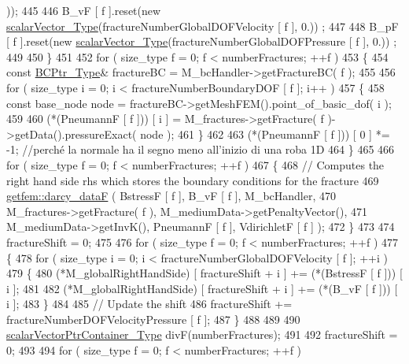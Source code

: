 \begin{DoxyCode}
      ));
445 
446         B\_vF [ f ].reset(\textcolor{keyword}{new} \hyperlink{Core_8h_a4e75b5863535ba1dd79942de2846eff0}{scalarVector\_Type}(fractureNumberGlobalDOFVelocity [ f ], 0.))
      ;
447 
448         B\_pF [ f ].reset(\textcolor{keyword}{new} \hyperlink{Core_8h_a4e75b5863535ba1dd79942de2846eff0}{scalarVector\_Type}(fractureNumberGlobalDOFPressure [ f ], 0.))
      ;
449         
450     \}
451 
452     \textcolor{keywordflow}{for} ( size\_type f = 0; f < numberFractures; ++f )
453     \{
454         \textcolor{keyword}{const} \hyperlink{BC_8h_a088c36f945ad8f6e7e0c7c423994c6ec}{BCPtr\_Type}& fractureBC = M\_bcHandler->getFractureBC( f );
455 
456         \textcolor{keywordflow}{for} ( size\_type i = 0; i < fractureNumberBoundaryDOF [ f ]; i++ )
457         \{
458             \textcolor{keyword}{const} base\_node node = fractureBC->getMeshFEM().point\_of\_basic\_dof( i );
459 
460             (*(PneumannF [ f ])) [ i ] = M\_fractures->getFracture( f )->getData().pressureExact( node );
461         \}
462 
463         (*(PneumannF [ f ])) [ 0 ] *= -1; \textcolor{comment}{//perché la normale ha il segno meno all'inizio di una roba 1D}
464     \}
465 
466     \textcolor{keywordflow}{for} ( size\_type f = 0; f < numberFractures; ++f )
467     \{
468         \textcolor{comment}{// Computes the right hand side rhs which stores the boundary conditions for the fracture}
469         \hyperlink{namespacegetfem_ad6e90b309c01f6b4fc91c9369cba376a}{getfem::darcy\_dataF} ( BstressF [ f ], B\_vF [ f ], M\_bcHandler,
470                               M\_fractures->getFracture( f ), M\_mediumData->getPenaltyVector(),
471                               M\_mediumData->getInvK(), PneumannF [ f ], VdirichletF [ f ] );
472     \}
473 
474     fractureShift = 0;
475     
476     \textcolor{keywordflow}{for} ( size\_type f = 0; f < numberFractures; ++f )
477     \{   
478         \textcolor{keywordflow}{for} ( size\_type i = 0; i < fractureNumberGlobalDOFVelocity [ f ]; ++i )
479         \{   
480             (*M\_globalRightHandSide) [ fractureShift + i ] += (*(BstressF [ f ])) [ i ];
481 
482             (*M\_globalRightHandSide) [ fractureShift + i ] += (*(B\_vF [ f ])) [ i ];
483         \}
484 
485         \textcolor{comment}{// Update the shift}
486         fractureShift += fractureNumberDOFVelocityPressure [ f ];
487     \}
488 
489 
490     \hyperlink{Core_8h_a20f0354ac7b92989514c678f4cdfcb6b}{scalarVectorPtrContainer\_Type} divF(numberFractures);
491 
492     fractureShift = 0;
493     
494     \textcolor{keywordflow}{for} ( size\_type f = 0; f < numberFractures; ++f )

\end{DoxyCode}
